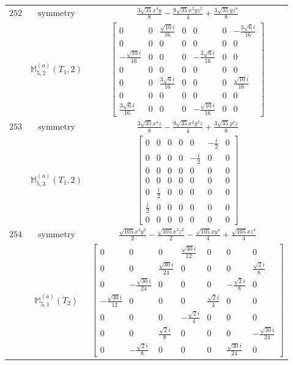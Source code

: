 \documentclass[fleqn,8pt,landscape]{jsarticle}
\begin{document}
\begin{longtable}{ccc}
$ 252 $ & $ \text{symmetry} $ & $ \frac{3 \sqrt{35} x^{4} y}{8} - \frac{9 \sqrt{35} x^{2} y z^{2}}{4} + \frac{3 \sqrt{35} y z^{4}}{8} $ \\
$  $ & $ \mathbb{M}_{5,2}^{(a)}(T_{1},2) $ & $ \begin{bmatrix} 0 & 0 & \frac{\sqrt{10} i}{16} & 0 & 0 & 0 & - \frac{3 \sqrt{6} i}{16} \\ 0 & 0 & 0 & 0 & 0 & 0 & 0 \\ - \frac{\sqrt{10} i}{16} & 0 & 0 & 0 & - \frac{3 \sqrt{6} i}{16} & 0 & 0 \\ 0 & 0 & 0 & 0 & 0 & 0 & 0 \\ 0 & 0 & \frac{3 \sqrt{6} i}{16} & 0 & 0 & 0 & \frac{\sqrt{10} i}{16} \\ 0 & 0 & 0 & 0 & 0 & 0 & 0 \\ \frac{3 \sqrt{6} i}{16} & 0 & 0 & 0 & - \frac{\sqrt{10} i}{16} & 0 & 0 \end{bmatrix} $ \\ \hline
$ 253 $ & $ \text{symmetry} $ & $ \frac{3 \sqrt{35} x^{4} z}{8} - \frac{9 \sqrt{35} x^{2} y^{2} z}{4} + \frac{3 \sqrt{35} y^{4} z}{8} $ \\
$  $ & $ \mathbb{M}_{5,3}^{(a)}(T_{1},2) $ & $ \begin{bmatrix} 0 & 0 & 0 & 0 & 0 & - \frac{i}{2} & 0 \\ 0 & 0 & 0 & 0 & - \frac{i}{2} & 0 & 0 \\ 0 & 0 & 0 & 0 & 0 & 0 & 0 \\ 0 & 0 & 0 & 0 & 0 & 0 & 0 \\ 0 & \frac{i}{2} & 0 & 0 & 0 & 0 & 0 \\ \frac{i}{2} & 0 & 0 & 0 & 0 & 0 & 0 \\ 0 & 0 & 0 & 0 & 0 & 0 & 0 \end{bmatrix} $ \\ \hline
$ 254 $ & $ \text{symmetry} $ & $ \frac{\sqrt{105} x^{3} y^{2}}{2} - \frac{\sqrt{105} x^{3} z^{2}}{2} - \frac{\sqrt{105} x y^{4}}{4} + \frac{\sqrt{105} x z^{4}}{4} $ \\
$  $ & $ \mathbb{M}_{5,1}^{(a)}(T_{2}) $ & $ \begin{bmatrix} 0 & 0 & 0 & \frac{\sqrt{30} i}{12} & 0 & 0 & 0 \\ 0 & 0 & \frac{\sqrt{30} i}{24} & 0 & 0 & 0 & \frac{\sqrt{2} i}{8} \\ 0 & - \frac{\sqrt{30} i}{24} & 0 & 0 & 0 & - \frac{\sqrt{2} i}{8} & 0 \\ - \frac{\sqrt{30} i}{12} & 0 & 0 & 0 & \frac{\sqrt{2} i}{4} & 0 & 0 \\ 0 & 0 & 0 & - \frac{\sqrt{2} i}{4} & 0 & 0 & 0 \\ 0 & 0 & \frac{\sqrt{2} i}{8} & 0 & 0 & 0 & - \frac{\sqrt{30} i}{24} \\ 0 & - \frac{\sqrt{2} i}{8} & 0 & 0 & 0 & \frac{\sqrt{30} i}{24} & 0 \end{bmatrix} $ \\ \hline

\end{longtable}
\end{document}

